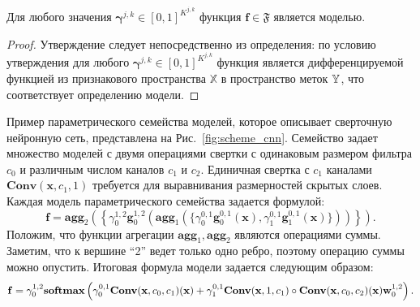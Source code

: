 \begin{utv}
Для любого значения $\boldsymbol{\gamma}^{j,k} \in [0,1]^{K^{j,k}}$ функция $\mathbf{f} \in \mathfrak{F}$ является моделью.
\end{utv}
\begin{proof}
Утверждение следует непосредственно из определения: по условию утверждения для любого $\boldsymbol{\gamma}^{j,k} \in [0,1]^{K^{j,k}}$ функция является дифференцируемой функцией из признакового пространства $\mathbb{X}$ в пространство меток $\mathbb{Y}$, что соответствует определению модели.
\end{proof}



Пример параметрического семейства моделей, которое описывает сверточную нейронную сеть, представлена на Рис.~\ref{fig:scheme_cnn}. Семейство задает множество моделей с двумя операциями свертки с одинаковым размером фильтра $c_0$ и различным числом каналов $c_1$ и $c_2$. Единичная свертка с $c_1$ каналами $\textbf{Conv}(\mathbf{x}, c_1, 1)$ требуется для выравнивания размерностей скрытых слоев. Каждая модель параметрического семейства задается формулой: 
\[
    \mathbf{f} = \textbf{agg}_2\left(\left\{{\gamma}^{1,2}_0 \mathbf{g}^{1,2}_0 \left(\textbf{agg}_1 \left(\{{\gamma}^{0,1}_0 \mathbf{g}^{0,1}_0(\mathbf{x}), {\gamma}^{0,1}_1 \mathbf{g}^{0,1}_1(\mathbf{x})  \} \right)\right)\right\}\right).
\]
Положим, что функции агрегации $ \textbf{agg}_1,  \textbf{agg}_2$ являются операциями суммы. Заметим, что к вершине ``2'' ведет только одно ребро, поэтому операцию суммы можно опустить. 
Итоговая формула модели задается следующим образом:
\[
    \mathbf{f} = {\gamma}^{1,2}_0 \textbf{softmax} \left({\gamma}^{0,1}_0 \textbf{Conv}(\mathbf{x}, c_0, c_1)(\mathbf{x}) + {\gamma}^{0,1}_1 \textbf{Conv}(\mathbf{x}, 1, c_1) \circ \textbf{Conv}(\mathbf{x}, c_0, c_2)(\mathbf{x}) \mathbf{w}^{1,2}_0\right).
\]



